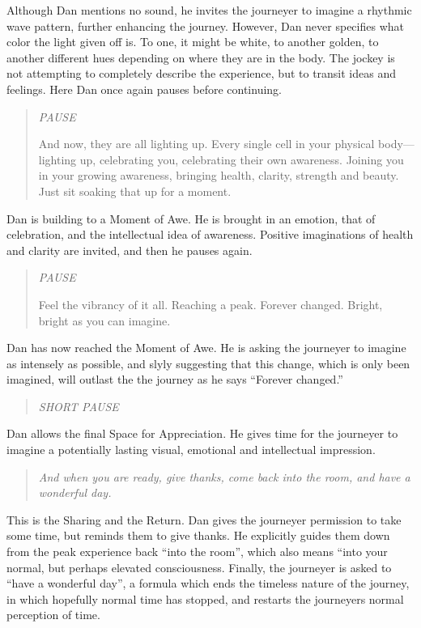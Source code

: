 \documentclass[12pt]{book}
\begin{document}
Although Dan mentions no sound, he invites the journeyer to
imagine a rhythmic wave pattern, further enhancing the journey.
However, Dan never specifies what color the light given off is.
To one, it might be white, to another golden, to another different
hues depending on where they are in the body. The jockey is not
attempting to completely describe the experience, but to
transit ideas and feelings. Here Dan once again pauses before
continuing.

\begin{quote}{\em
  PAUSE



And now, they are all lighting up. Every single cell in your physical
body---lighting up, celebrating you, celebrating their own awareness.
Joining you in your growing awareness, bringing health, clarity,
strength and beauty. Just sit soaking that up for a moment.
  }\end{quote}

Dan is building to a Moment of Awe. He is brought in an emotion,
that of celebration, and the intellectual idea of awareness.
Positive imaginations of health and clarity are invited,
and then he pauses again.

\begin{quote}{\em
PAUSE

Feel the vibrancy of it all. Reaching a peak. Forever changed.
Bright, bright as you can imagine.
  }\end{quote}

Dan has now reached the Moment of Awe. He is asking the journeyer
to imagine as intensely as possible, and slyly suggesting that this
change, which is only been imagined, will outlast the the journey
as he says ``Forever changed.''

\begin{quote}{\em
  SHORT PAUSE
  }\end{quote}

Dan allows the final Space for Appreciation. He gives time
for the journeyer to imagine a potentially lasting
visual, emotional and intellectual impression.

\begin{quote}{\em
And when you are ready, give thanks, come back into the room,
and have a wonderful day.
}\end{quote}

This is the Sharing and the Return. Dan gives the journeyer
permission to take some time, but reminds them to give thanks.
He explicitly guides them down from the peak experience back
``into the room'', which also means ``into your normal, but
perhaps elevated consciousness. Finally, the journeyer is
asked to ``have a wonderful day'', a formula which ends
the timeless nature of the journey, in which hopefully
normal time has stopped, and restarts the journeyers normal
perception of time.
\end{document}
